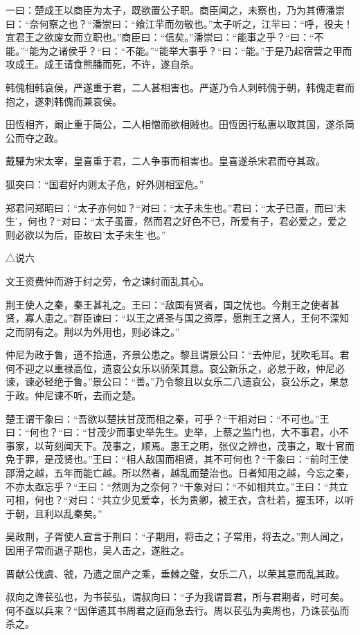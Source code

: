 \documentclass[]{article}
\begin{document}
一曰：楚成王以商臣为太子，既欲置公子职。商臣闻之，未察也，乃为其傅潘崇曰：``奈何察之也？``潘崇曰：``飨江羋而勿敬也。''太子听之，江羋曰：``呼，役夫！宜君王之欲废女而立职也。''商臣曰：``信矣。''潘崇曰：``能事之乎？``曰：``不能。''``能为之诸侯乎？``曰：``不能。''``能举大事乎？``曰：``能。''于是乃起宿营之甲而攻成王。成王请食熊膰而死，不许，遂自杀。

韩傀相韩哀侯，严遂重于君，二人甚相害也。严遂乃令人刺韩傀于朝，韩傀走君而抱之，遂刺韩傀而兼哀侯。

田恆相齐，阚止重于简公，二人相憎而欲相贼也。田恆因行私惠以取其国，遂杀简公而夺之政。

戴驩为宋太宰，皇喜重于君，二人争事而相害也。皇喜遂杀宋君而夺其政。

狐突曰：``国君好内则太子危，好外则相室危。''

郑君问郑昭曰：``太子亦何如？``对曰：``太子未生也。''君曰：``太子已置，而曰'未生'，何也？``对曰：``太子虽置，然而君之好色不已，所爱有子，君必爱之，爱之则必欲以为后，臣故曰'太子未生'也。''

△说六

文王资费仲而游于纣之旁，令之谏纣而乱其心。

荆王使人之秦，秦王甚礼之。王曰：``敌国有贤者，国之忧也。今荆王之使者甚贤，寡人患之。''群臣谏曰：``以王之贤圣与国之资厚，愿荆王之贤人，王何不深知之而阴有之。荆以为外用也，则必诛之。''

仲尼为政于鲁，道不拾遗，齐景公患之。黎且谓景公曰：``去仲尼，犹吹毛耳。君何不迎之以重禄高位，遗哀公女乐以骄荣其意。哀公新乐之，必怠于政，仲尼必谏，谏必轻绝于鲁。''景公曰：``善。''乃令黎且以女乐二八遗哀公，哀公乐之，果怠于政。仲尼谏不听，去而之楚。

楚王谓干象曰：``吾欲以楚扶甘茂而相之秦，可乎？``干相对曰：``不可也。''王曰：``何也？``曰：``甘茂少而事史举先生。史举，上蔡之监门也，大不事君，小不事家，以苛刻闻天下。茂事之，顺焉。惠王之明，张仪之辨也，茂事之，取十官而免于罪，是茂贤也。''王曰：``相人敌国而相贤，其不可何也？``干象曰：``前时王使邵滑之越，五年而能亡越。所以然者，越乱而楚治也。日者知用之越，今忘之秦，不亦太亟忘乎？``王曰：``然则为之奈何？``干象对曰：``不如相共立。''王曰：``共立可相，何也？``对曰：``共立少见爱幸，长为贵卿，被王衣，含杜若，握玉环，以听于朝，且利以乱秦矣。''

吴政荆，子胥使人宣言于荆曰：``子期用，将击之；子常用，将去之。''荆人闻之，因用子常而退子期也，吴人击之，遂胜之。

晋献公伐虞、虢，乃遗之屈产之乘，垂棘之璧，女乐二八，以荣其意而乱其政。

叔向之谗苌弘也，为书苌弘，谓叔向曰：``子为我谓晋君，所与君期者，时可矣。何不亟以兵来？``因佯遗其书周君之庭而急去行。周以苌弘为卖周也，乃诛苌弘而杀之。
\end{document}
